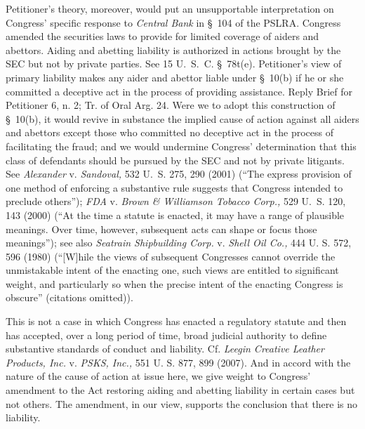   Petitioner's theory, moreover, would put an unsupportable interpretation on Congress' specific response to \emph{Central Bank} in \S~104 of the PSLRA. Congress amended the securities laws to provide for limited coverage of aiders and abettors. Aiding and abetting liability is authorized in actions brought by the SEC but not by private parties. See 15 U.~S.~C. \S~78t(e). Petitioner's view of primary liability makes any aider and abettor liable under \S~10(b) if he or she committed a deceptive act in the process of providing assistance. Reply Brief for Petitioner 6, n. 2; Tr. of Oral Arg. 24. Were we to adopt this construction of \S~10(b), it would revive in substance the implied cause of action against all aiders \newpage  and abettors except those who committed no deceptive act in the process of facilitating the fraud; and we would undermine Congress' determination that this class of defendants should be pursued by the SEC and not by private litigants. See \emph{Alexander} v. \emph{Sandoval,} 532 U.~S. 275, 290 (2001) (``The express provision of one method of enforcing a substantive rule suggests that Congress intended to preclude others''); \emph{FDA} v. \emph{Brown \& Williamson Tobacco Corp.,} 529 U.~S. 120, 143 (2000) (``At the time a statute is enacted, it may have a range of plausible meanings. Over time, however, subsequent acts can shape or focus those meanings''); see also \emph{Seatrain Shipbuilding Corp.} v. \emph{Shell Oil Co.,} 444 U. S. 572, 596 (1980) (``[W]hile the views of subsequent Congresses cannot override the unmistakable intent of the enacting one, such views are entitled to significant weight, and particularly so when the precise intent of the enacting Congress is obscure'' (citations omitted)).

  This is not a case in which Congress has enacted a regulatory statute and then has accepted, over a long period of time, broad judicial authority to define substantive standards of conduct and liability. Cf. \emph{Leegin Creative Leather Products, Inc.} v. \emph{PSKS, Inc.,} 551 U. S. 877, 899 (2007). And in accord with the nature of the cause of action at issue here, we give weight to Congress' amendment to the Act restoring aiding and abetting liability in certain cases but not others. The amendment, in our view, supports the conclusion that there is no liability.

